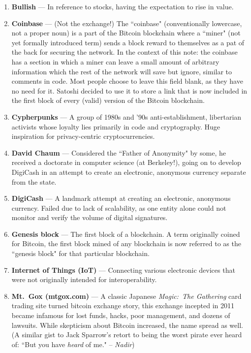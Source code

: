 \documentclass[full.tex]{subfiles}
\begin{document}
    \begin{enumerate}
        \item \textbf{Bullish} --- In reference to stocks, having the expectation to rise in value.
    
        \item \textbf{Coinbase} --- (Not the exchange!) The ``coinbase" (conventionally lowercase, not a proper noun) is a part of the Bitcoin blockchain where a ``miner" (not yet formally introduced term) sends a block reward to themselves as a pat of the back for securing the network. In the context of this note: the coinbase has a section in which a miner can leave a small amount of arbitrary information which the rest of the network will save but ignore, similar to comments in code. Most people choose to leave this field blank, as they have no need for it. Satoshi decided to use it to store a link that is now included in the first block of every (valid) version of the Bitcoin blockchain.
        
        \item \textbf{Cypherpunks} --- A group of 1980s and '90s anti-establishment, libertarian activists whose loyalty lies primarily in code and cryptography. Huge inspiration for privacy-centric cryptocurrencies.
        
        \item \textbf{David Chaum} --- Considered the ``Father of Anonymity" by some, he received a doctorate in computer science (at Berkeley!), going on to develop DigiCash in an attempt to create an electronic, anonymous currency separate from the state.
        
        \item \textbf{DigiCash} --- A landmark attempt at creating an electronic, anonymous currency. Failed due to lack of scalability, as one entity alone could not monitor and verify the volume of digital signatures.
        
        \item \textbf{Genesis block} --- The first block of a blockchain. A term originally coined for Bitcoin, the first block mined of any blockchain is now referred to as the ``genesis block" for that particular blockchain.
        
        \item \textbf{Internet of Things (IoT)} --- Connecting various electronic devices that were not originally intended for interoperability. 
        
        \item \textbf{Mt.\ Gox (mtgox.com)} --- A classic Japanese \textit{Magic:\ The Gathering} card trading site turned bitcoin exchange story, this exchange incepted in 2011 became infamous for lost funds, hacks, poor management, and dozens of lawsuits. While skepticism about Bitcoin increased, the name spread as well. (A similar gist to Jack Sparrow's retort to being the worst pirate ever heard of: ``But you have \emph{heard} of me." -- \textit{Nadir})
        

\end{enumerate}
\end{document}
